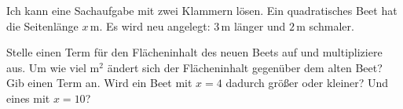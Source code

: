 \begin{aufgabe}{Ich kann eine Sachaufgabe mit zwei Klammern lösen.}
Ein quadratisches Beet hat die Seitenlänge $x$\,m. Es wird neu angelegt: $3$\,m länger und $2$\,m schmaler.


\begin{teile}
\teil Stelle einen Term für den Flächeninhalt des neuen Beets auf und multipliziere aus.
\teil Um wie viel m$^2$ ändert sich der Flächeninhalt gegenüber dem alten Beet? Gib einen Term an.
\teil Wird ein Beet mit $x = 4$ dadurch größer oder kleiner? Und eines mit $x = 10$?
\end{teile}
\end{aufgabe}
